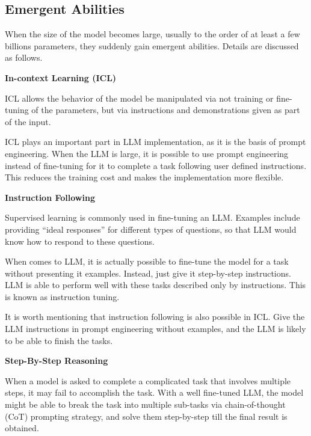 \subsection{Emergent Abilities}

When the size of the model becomes large, usually to the order of at least a few billions parameters, they suddenly gain emergent abilities. Details are discussed as follows.

\vspace{0.1in}
\noindent \textbf{In-context Learning (ICL)}
\vspace{0.1in}

ICL allows the behavior of the model be manipulated via not training or fine-tuning of the parameters, but via instructions and demonstrations given as part of the input.

ICL plays an important part in LLM implementation, as it is the basis of prompt engineering. When the LLM is large, it is possible to use prompt engineering instead of fine-tuning for it to complete a task following user defined instructions. This reduces the training cost and makes the implementation more flexible.

\vspace{0.1in}
\noindent \textbf{Instruction Following}
\vspace{0.1in}

Supervised learning is commonly used in fine-tuning an LLM. Examples include providing ``ideal responses'' for different types of questions, so that LLM would know how to respond to these questions.

When comes to LLM, it is actually possible to fine-tune the model for a task without presenting it examples. Instead, just give it step-by-step instructions. LLM is able to perform well with these tasks described only by instructions. This is known as instruction tuning.

It is worth mentioning that instruction following is also possible in ICL. Give the LLM instructions in prompt engineering without examples, and the LLM is likely to be able to finish the tasks.

\vspace{0.1in}
\noindent \textbf{Step-By-Step Reasoning}
\vspace{0.1in}

When a model is asked to complete a complicated task that involves multiple steps, it may fail to accomplish the task. With a well fine-tuned LLM, the model might be able to break the task into multiple sub-tasks via chain-of-thought (CoT) prompting strategy, and solve them step-by-step till the final result is obtained.

